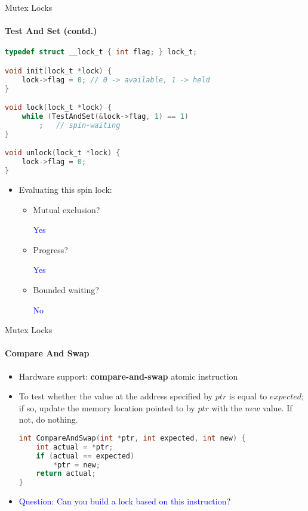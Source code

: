 \documentclass[10pt]{beamer}
\begin{document}
\begin{frame}[fragile]{Mutex Locks}
\framesubtitle{Test And Set (contd.)}
\begin{lstlisting}[language=C]
typedef struct __lock_t { int flag; } lock_t;

void init(lock_t *lock) {
	lock->flag = 0;	// 0 -> available, 1 -> held
}

void lock(lock_t *lock) {
	while (TestAndSet(&lock->flag, 1) == 1)
		;	// spin-waiting
}

void unlock(lock_t *lock) {
	lock->flag = 0;
}
\end{lstlisting}
\begin{itemize}
 
\item Evaluating this spin lock:
\begin{itemize}
\item Mutual exclusion?
\begin{uncoverenv}
\textcolor{blue}{Yes}
\end{uncoverenv}
\item Progress?
\begin{uncoverenv}
\textcolor{blue}{Yes}
\end{uncoverenv}
\item Bounded waiting?
\begin{uncoverenv}
\textcolor{blue}{No}
\end{uncoverenv}
\end{itemize}
\end{itemize}
\end{frame}

\begin{frame}[fragile]{Mutex Locks}
\framesubtitle{Compare And Swap}
\begin{itemize}
 
\item Hardware support: \textbf{\alert{compare-and-swap}} atomic instruction
\item To test whether the value at the address specified by $ptr$ is equal to $expected$; if so, update the memory location pointed to by $ptr$ with the $new$ value. If not, do nothing.
\vspace{6pt}\\
\begin{uncoverenv}
\begin{lstlisting}[language=C]
int CompareAndSwap(int *ptr, int expected, int new) {
	int actual = *ptr;
	if (actual == expected)
		*ptr = new;
	return actual;
}
\end{lstlisting}
\end{uncoverenv}
\item \textcolor{blue}{Question: Can you build a lock based on this instruction?}
\end{itemize}
\end{frame}
\end{document}
